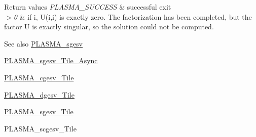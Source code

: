 \begin{DoxyRetVals}{Return values}
{\em P\+L\+A\+S\+M\+A\+\_\+\+S\+U\+C\+C\+E\+S\+S} & successful exit \\
\hline
{\em $>$0} & if i, U(i,i) is exactly zero. The factorization has been completed, but the factor U is exactly singular, so the solution could not be computed.\\
\hline
\end{DoxyRetVals}
\begin{DoxySeeAlso}{See also}
\hyperlink{group__float_ga39018420f926f77ef11c50c82f66da77_ga39018420f926f77ef11c50c82f66da77}{P\+L\+A\+S\+M\+A\+\_\+sgesv} 

\hyperlink{group__float__Tile__Async_ga1a8bb4c4851dd9c4221070eb655286df_ga1a8bb4c4851dd9c4221070eb655286df}{P\+L\+A\+S\+M\+A\+\_\+sgesv\+\_\+\+Tile\+\_\+\+Async} 

\hyperlink{group__PLASMA__Complex32__t__Tile_ga0dfdc0c54977335c9afb38f60764274d_ga0dfdc0c54977335c9afb38f60764274d}{P\+L\+A\+S\+M\+A\+\_\+cgesv\+\_\+\+Tile} 

\hyperlink{group__double__Tile_gaacf09cca256b82b81087dffa3cabe2d8_gaacf09cca256b82b81087dffa3cabe2d8}{P\+L\+A\+S\+M\+A\+\_\+dgesv\+\_\+\+Tile} 

\hyperlink{group__float__Tile_gaff4ad087d2efc588d2ca4152c4edd398_gaff4ad087d2efc588d2ca4152c4edd398}{P\+L\+A\+S\+M\+A\+\_\+sgesv\+\_\+\+Tile} 

P\+L\+A\+S\+M\+A\+\_\+scgesv\+\_\+\+Tile 
\end{DoxySeeAlso}
\hypertarget{group__float__Tile_gad636cb478efcce3495f47a9a2e9fbc76_gad636cb478efcce3495f47a9a2e9fbc76}{}
